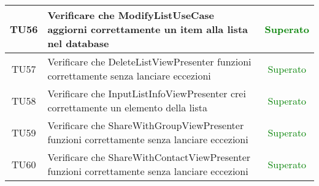 \begin{center}
\begin{longtable}{|c|>{\centering}m{10cm}|c|}
		TU56 & Verificare che ModifyListUseCase aggiorni correttamente un item alla lista nel database & \textcolor{Green}{Superato}\\ \hline
		TU57 & Verificare che DeleteListViewPresenter funzioni correttamente senza lanciare eccezioni & \textcolor{Green}{Superato}\\ \hline
		TU58 & Verificare che InputListInfoViewPresenter crei correttamente un elemento della lista & \textcolor{Green}{Superato}\\ \hline
		TU59 & Verificare che ShareWithGroupViewPresenter funzioni correttamente senza lanciare eccezioni & \textcolor{Green}{Superato}\\ \hline
		TU60 & Verificare che ShareWithContactViewPresenter funzioni correttamente senza lanciare eccezioni & \textcolor{Green}{Superato}\\ \hline
	\end{longtable}
\end{center}
